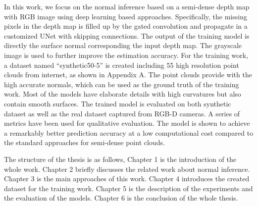 In this work, we focus on the normal inference based on a semi-dense depth map with RGB image using deep learning based approaches. Specifically, the missing pixels in the depth map is filled up by the gated convolution and propagate in a customized UNet with skipping connections. The output of the training model is directly the surface normal corresponding the input depth map. The grayscale image is used to further improve the estimation accuracy. 
For the training work, a dataset named “synthetic50-5” is created including 55 high resolution point clouds from internet, as shown in Appendix A. The point clouds provide with the high accurate normals, which can be used as the ground truth of the training work. Most of the models have elaborate details with high curvatures but also contain smooth surfaces. The trained model is evaluated on both synthetic dataset as well as the real dataset captured from RGB-D cameras. A series of metrics have been used for qualitative evaluation. The model is shown to achieve a remarkably better prediction accuracy at a low computational cost compared to the standard approaches for semi-dense point clouds.  

The structure of the thesis is as follows, Chapter 1 is the introduction of the whole work. Chapter 2 briefly discusses the related work about normal inference. Chapter 3 is the main approaches of this work. Chapter 4 introduces the created dataset for the training work. Chapter 5 is the description of the experiments and the evaluation of the models. Chapter 6 is the conclusion of the whole thesis.



